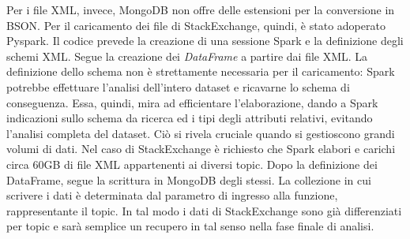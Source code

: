 Per i file XML, invece, MongoDB non offre delle estensioni per la conversione in BSON. Per il caricamento dei file di StackExchange, quindi, è stato adoperato Pyspark. Il codice prevede la creazione di una sessione Spark e la definizione degli schemi XML. Segue la creazione dei \emph{DataFrame} a partire dai file XML. La definizione dello schema non è strettamente necessaria per il caricamento: Spark potrebbe effettuare l'analisi dell'intero dataset e ricavarne lo schema di conseguenza. Essa, quindi, mira ad efficientare l'elaborazione, dando a Spark indicazioni sullo schema da ricerca ed i tipi degli attributi relativi, evitando l'analisi completa del dataset. Ciò si rivela cruciale quando si gestioscono grandi volumi di dati. Nel caso di StackExchange è richiesto che Spark elabori e carichi circa 60GB di file XML appartenenti ai diversi topic. Dopo la definizione dei DataFrame, segue la scrittura in MongoDB degli stessi. La collezione in cui scrivere i dati è determinata dal parametro di ingresso alla funzione, rappresentante il topic. In tal modo i dati di StackExchange sono già differenziati per topic e sarà semplice un recupero in tal senso nella fase finale di analisi.
